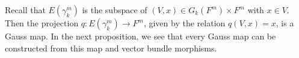 Recall that $E(\gamma_k^m)$ is the subspace of $(V, x) \in G_k(F^m) \times F^m$ with $x \in V$. Then the projection $q: E(\gamma_k^m) \rightarrow F^m$, given by the relation $q(V, x) = x$, is a Gauss map. In the next proposition, we see that every Gauss map can be constructed from this map and vector bundle morphisms.
